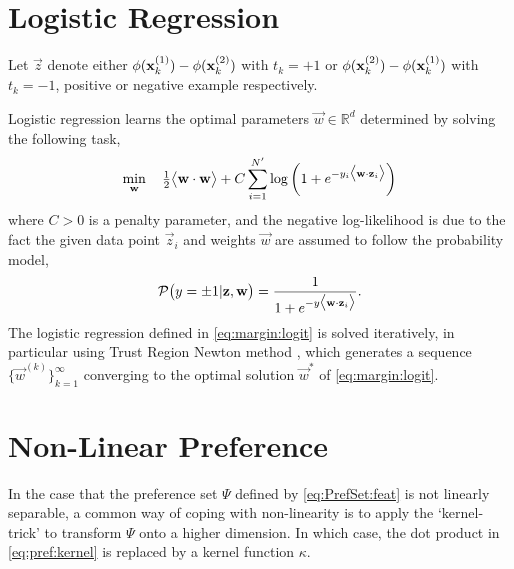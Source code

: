 \section{Logistic Regression}
Let $\vec{z}$ denote either ${\mathbf{\phi}}(\mathbf{x}_k^{(1)})-{\mathbf{\phi}}(\mathbf{x}_k^{(2)})$ 
with \mbox{$t_k=+1$} or 
${\mathbf{\phi}}(\mathbf{x}_k^{(2)})-{\mathbf{\phi}}(\mathbf{x}_k^{(1)})$ with \mbox{$t_k=-1$}, positive 
or negative example respectively.

Logistic regression learns the optimal parameters $\vec{w}\in\mathbb{R}^d$ 
determined by solving the following task,
\begin{equation}\label{eq:margin:logit}
\min_{\vec{w}}\quad \tfrac{1}{2}\inner{\vec{w}}{\vec{w}} + C \sum_{i=1}^{N'} 
\log\left(1 + e^{-y_i \inner{\vec{w}}{\vec{z}_i}}\right) 
\end{equation}
where $C > 0$ is a penalty parameter, and the negative log-likelihood is due to 
the fact the given data point $\vec{z}_i$ and weights $\vec{w}$ are assumed to 
follow the probability model,
\begin{equation}\label{eq:prob}
\mathcal{P}\big(y=\pm1|\vec{z},\vec{w}\big)=\frac{1}{1+e^{-y\inner{\vec{w}}{\vec{z}_i}}}.
\end{equation}
The logistic regression defined in \cref{eq:margin:logit} is solved 
iteratively, in particular using Trust Region Newton method 
\citep[cf.][]{Lin08:newtontrustregion}, which generates a sequence 
$\{\vec{w}^{(k)}\}_{k=1}^\infty$ converging to the optimal solution $\vec{w}^*$ 
of \cref{eq:margin:logit}.


\section{Non-Linear Preference}\label{sec:ord:nonlinpref}
In the case that the preference set $\Psi$ defined by \cref{eq:PrefSet:feat} is 
not linearly separable, a common way of coping with non-linearity is to apply 
the `kernel-trick' to transform $\Psi$ onto a higher dimension. In which case, 
the dot product in \cref{eq:pref:kernel} is replaced by a kernel function 
$\kappa$.

